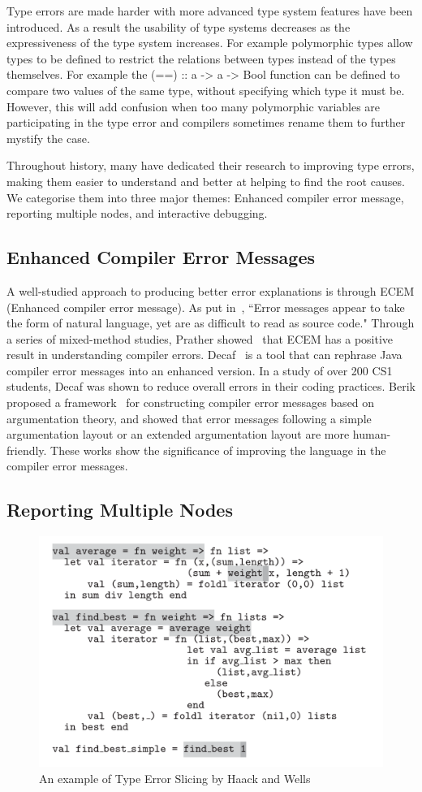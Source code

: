 Type errors are made harder with more advanced type system features have been introduced. As a result the usability of type systems decreases as the expressiveness of the type system increases. For example polymorphic types allow types to be defined to restrict the relations between types instead of the types themselves. For example the (==) :: a -> a -> Bool function can be defined to compare two values of the same type, without specifying which type it must be. However, this will add confusion when too many polymorphic variables are participating in the type error and compilers sometimes rename them to further mystify the case.


Throughout history, many have dedicated their research to improving type errors, making them easier to understand and better at helping to find the root causes. We categorise them into three major themes: Enhanced compiler error message, reporting multiple nodes, and interactive debugging.

\subsection{Enhanced Compiler Error Messages}

A well-studied approach to producing better error explanations is through ECEM (Enhanced compiler error message).  As put in~\cite{Barik2017-gy}, ``Error messages appear to take the form of natural language, yet are as difficult to read as source code."   Through a series of mixed-method studies, Prather showed~\cite{Prather2017-dg} that ECEM has a positive result in understanding compiler errors. Decaf~\cite{Becker2016-kc} is a tool that can rephrase Java compiler error messages into an enhanced version. In a study of over 200 CS1 students, Decaf was shown to reduce overall errors in their coding practices. Berik proposed a framework~\cite{Barik2018-xs} for constructing compiler error messages based on argumentation theory, and showed that error messages following a simple argumentation layout or an extended argumentation layout are more human-friendly.  These works show the significance of improving the language in the compiler error messages. 


\subsection{Reporting Multiple Nodes}

\begin{figure}[hbt]
    \includegraphics[width=0.6\linewidth]{HaackTypeErrorSlicing}
    \caption{An example of Type Error Slicing by Haack and Wells
    }
\end{figure}

